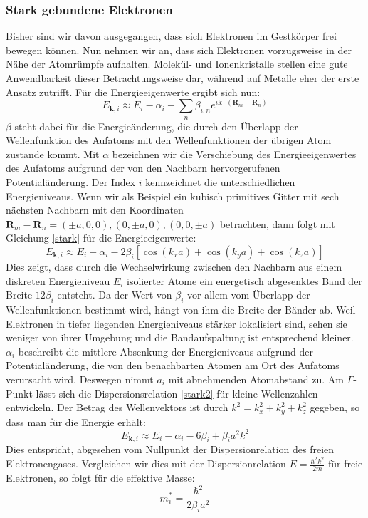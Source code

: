 \documentclass[11pt]{article}
\begin{document}
\subsubsection{Stark gebundene Elektronen}
Bisher sind wir davon ausgegangen, dass sich Elektronen im Gestkörper frei
bewegen können. Nun nehmen wir an, dass sich Elektronen vorzugsweise in der
Nähe der Atomrümpfe aufhalten. Molekül- und Ionenkristalle stellen eine gute
Anwendbarkeit dieser Betrachtungsweise dar, während auf Metalle eher der erste
Ansatz zutrifft. Für die Energieeigenwerte ergibt sich nun:
\begin{equation}\label{stark}
  E_{\bm{k},i}\approx E_i-\alpha_i-\sum_n\beta_{i,n}
  e^{i\bm{k}\cdot(\bm{R}_m-\bm{R}_n)}
\end{equation}
$\beta$ steht dabei für die Energieänderung, die durch den Überlapp der
Wellenfunktion des Aufatoms mit den Wellenfunktionen der übrigen Atom zustande
kommt. Mit $\alpha$ bezeichnen wir die Verschiebung des Energieeigenwertes des
Aufatoms aufgrund der von den Nachbarn hervorgerufenen Potentialänderung. Der
Index $i$ kennzeichnet die unterschiedlichen Energieniveaus. Wenn wir als
Beispiel ein kubisch primitives Gitter mit sech nächsten Nachbarn mit den
Koordinaten $\bm{R}_m-\bm{R}_n=(\pm a,0,0),(0,\pm a,0),(0,0,\pm a)$ betrachten,
dann folgt mit Gleichung \ref{stark} für die Energieeigenwerte:
\begin{equation}\label{stark2}
  E_{\bm{k},i}\approx E_i-\alpha_i-2\beta_i[\cos(k_x a)+\cos(k_y a)+\cos(k_z a)]
\end{equation}
Dies zeigt, dass durch die Wechselwirkung zwischen den Nachbarn aus einem
diskreten Energieniveau $E_i$ isolierter Atome ein energetisch abgesenktes Band
der Breite $12\beta_i$ entsteht. Da der Wert von $\beta_i$ vor allem vom
Überlapp der Wellenfunktionen bestimmt wird, hängt von ihm die Breite der Bänder
ab. Weil Elektronen in tiefer liegenden Energieniveaus stärker lokalisiert sind,
sehen sie weniger von ihrer Umgebung und die Bandaufspaltung ist entsprechend
kleiner. $\alpha_i$ beschreibt die mittlere Absenkung der Energieniveaus
aufgrund der Potentialänderung, die von den benachbarten Atomen am Ort des
Aufatoms verursacht wird. Deswegen nimmt $a_i$ mit abnehmenden Atomabstand zu.
Am $\Gamma$-Punkt lässt sich die Dispersionsrelation \ref{stark2} für kleine
Wellenzahlen entwickeln. Der Betrag des Wellenvektors ist durch
$k^2=k_x^2+k_y^2+k_z^2$ gegeben, so dass man für die Energie erhält:
\begin{equation}
  E_{\bm{k},i}\approx E_i-\alpha_i-6\beta_i+\beta_ia^2k^2
\end{equation}
Dies entspricht, abgesehen vom Nullpunkt der Dispersionrelation des freien
Elektronengases. Vergleichen wir dies mit der Dispersionrelation
$E=\frac{\hbar^2k^2}{2m}$ für freie Elektronen, so folgt für die effektive
Masse:
\begin{equation}
  m_i^*=\frac{\hbar^2}{2\beta_ia^2}
\end{equation}
\end{document}
